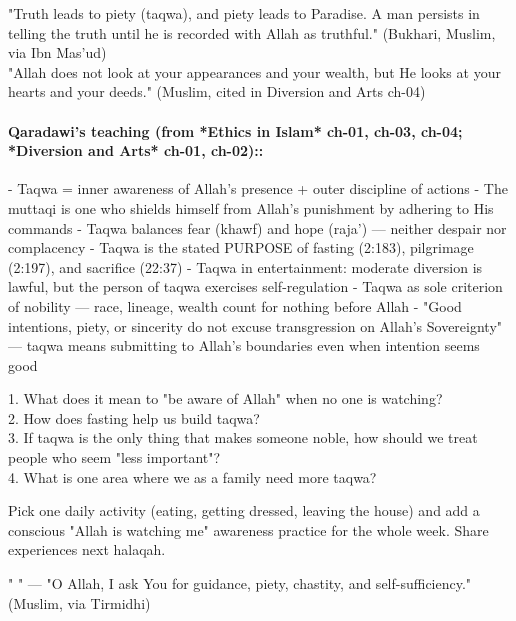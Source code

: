 \documentclass[11pt,a4paper]{article}
\begin{document}
\begin{hadithbox} "Truth leads to piety (taqwa), and piety leads to Paradise. A man persists in telling the truth until he is recorded with Allah as truthful." (Bukhari, Muslim, via Ibn Mas'ud) \\ "Allah does not look at your appearances and your wealth, but He looks at your hearts and your deeds." (Muslim, cited in Diversion and Arts ch-04) \end{hadithbox}

\paragraph*{Qaradawi's teaching (from *Ethics in Islam* ch-01, ch-03, ch-04; *Diversion and Arts* ch-01, ch-02)::}  - Taqwa = inner awareness of Allah's presence + outer discipline of actions - The muttaqi is one who shields himself from Allah's punishment by adhering to His commands - Taqwa balances fear (khawf) and hope (raja') --- neither despair nor complacency - Taqwa is the stated PURPOSE of fasting (2:183), pilgrimage (2:197), and sacrifice (22:37) - Taqwa in entertainment: moderate diversion is lawful, but the person of taqwa exercises self-regulation - Taqwa as sole criterion of nobility --- race, lineage, wealth count for nothing before Allah - "Good intentions, piety, or sincerity do not excuse transgression on Allah's Sovereignty" --- taqwa means submitting to Allah's boundaries even when intention seems good

\begin{discussionbox} 1. What does it mean to "be aware of Allah" when no one is watching? \\ 2. How does fasting help us build taqwa? \\ 3. If taqwa is the only thing that makes someone noble, how should we treat people who seem "less important"? \\ 4. What is one area where we as a family need more taqwa? \end{discussionbox}

\begin{activitybox} Pick one daily activity (eating, getting dressed, leaving the house) and add a conscious "Allah is watching me" awareness practice for the whole week. Share experiences next halaqah. \end{activitybox}

\begin{duabox} "      " --- "O Allah, I ask You for guidance, piety, chastity, and self-sufficiency." (Muslim, via Tirmidhi) \end{duabox}
\end{document}
